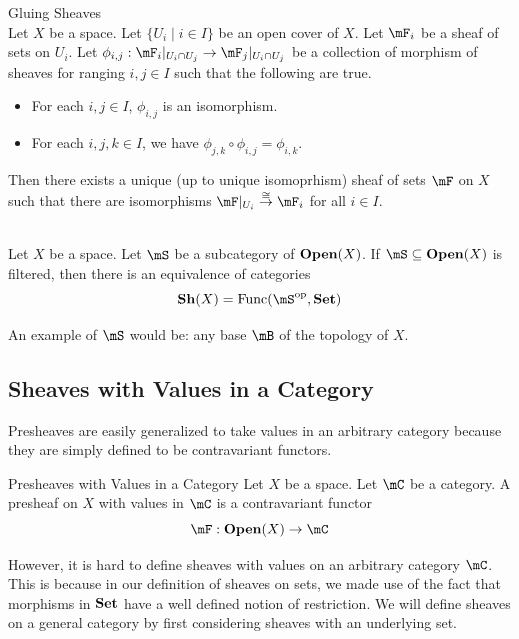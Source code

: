 \documentclass[a4paper]{article}
\begin{document}
\begin{prp}{Gluing Sheaves}{}\\
Let $X$ be a space. Let $\{U_i\;|\;i\in I\}$ be an open cover of $X$. Let $\mF_i$ be a sheaf of sets on $U_i$. Let $\phi_{i,j}:\mF_i|_{U_i\cap U_j}\to\mF_j|_{U_i\cap U_j}$ be a collection of morphism of sheaves for ranging $i,j\in I$ such that the following are true. 
\begin{itemize}
\item For each $i,j\in I$, $\phi_{i,j}$ is an isomorphism. 
\item For each $i,j,k\in I$, we have $\phi_{j,k}\circ\phi_{i,j}=\phi_{i,k}$. 
\end{itemize}
Then there exists a unique (up to unique isomoprhism) sheaf of sets $\mF$ on $X$ such that there are isomorphisms $\mF|_{U_i}\overset{\cong}{\to}\mF_i$ for all $i\in I$. 
\end{prp}

\begin{prp}{}{}\\
Let $X$ be a space. Let $\mS$ be a subcategory of $\bold{Open}(X)$. If $\mS\subseteq\bold{Open}(X)$ is filtered, then there is an equivalence of categories $$\bold{Sh}(X)=\text{Func}(\mS^\text{op},\bold{Set})$$
\end{prp}

An example of $\mS$ would be: any base $\mB$ of the topology of $X$. 

\subsection{Sheaves with Values in a Category}
Presheaves are easily generalized to take values in an arbitrary category because they are simply defined to be contravariant functors. 

\begin{defn}{Presheaves with Values in a Category}{} Let $X$ be a space. Let $\mC$ be a category. A presheaf on $X$ with values in $\mC$ is a contravariant functor $$\mF:\bold{Open}(X)\to\mC$$
\end{defn}

However, it is hard to define sheaves with values on an arbitrary category $\mC$. This is because in our definition of sheaves on sets, we made use of the fact that morphisms in $\bold{Set}$ have a well defined notion of restriction. We will define sheaves on a general category by first considering sheaves with an underlying set. 
\end{document}
